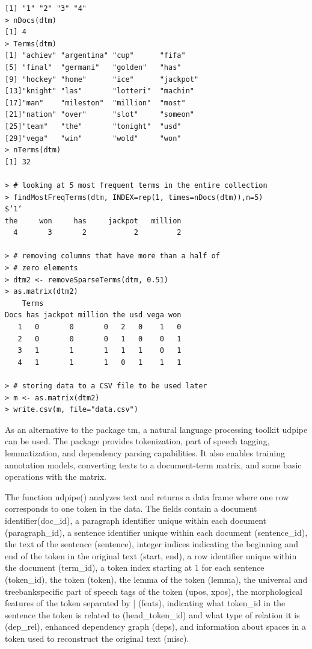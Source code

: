 \documentclass[11pt,openany,executivepaper]{book}
\begin{document}
\begin{verbatim}
[1] "1" "2" "3" "4"
> nDocs(dtm)
[1] 4
> Terms(dtm)
[1] "achiev" "argentina" "cup"      "fifa"
[5] "final"  "germani"   "golden"   "has"
[9] "hockey" "home"      "ice"      "jackpot"
[13]"knight" "las"       "lotteri"  "machin"
[17]"man"    "mileston"  "million"  "most"
[21]"nation" "over"      "slot"     "someon"
[25]"team"   "the"       "tonight"  "usd"
[29]"vega"   "win"       "wold"     "won"
> nTerms(dtm)
[1] 32

> # looking at 5 most frequent terms in the entire collection
> findMostFreqTerms(dtm, INDEX=rep(1, times=nDocs(dtm)),n=5)
$‘1‘
the     won     has     jackpot   million
  4       3       2           2         2
  
> # removing columns that have more than a half of
> # zero elements
> dtm2 <- removeSparseTerms(dtm, 0.51)
> as.matrix(dtm2)
    Terms
Docs has jackpot million the usd vega won
   1   0       0       0   2   0    1   0
   2   0       0       0   1   0    0   1
   3   1       1       1   1   1    0   1
   4   1       1       1   0   1    1   1

> # storing data to a CSV file to be used later
> m <- as.matrix(dtm2)
> write.csv(m, file="data.csv")
\end{verbatim}

As an alternative to the package tm, a natural language processing toolkit
udpipe can be used. The package provides tokenization, part of speech tagging,
lemmatization, and dependency parsing capabilities. It also enables training annotation models, converting texts to a document-term matrix, and some basic
operations with the matrix.


The function udpipe() analyzes text and returns a data frame where one row corresponds to one token in the data. The fields contain a document identifier(doc\_id), a paragraph identifier unique within each document (paragraph\_id), a sentence identifier unique within each document (sentence\_id), the text of the sentence (sentence), integer indices indicating the beginning and end of the token in the original text (start, end), a row identifier unique within the document (term\_id), a token index starting at 1 for each sentence (token\_id), the token (token), the lemma of the token (lemma), the universal and treebankspecific part of speech tags of the token (upos, xpos), the morphological features of the token separated by | (feats), indicating what token\_id in the sentence the token is related to (head\_token\_id) and what type of relation it is (dep\_rel), enhanced dependency graph (deps), and information about spaces in a token used to reconstruct the original text (misc).
\end{document}
